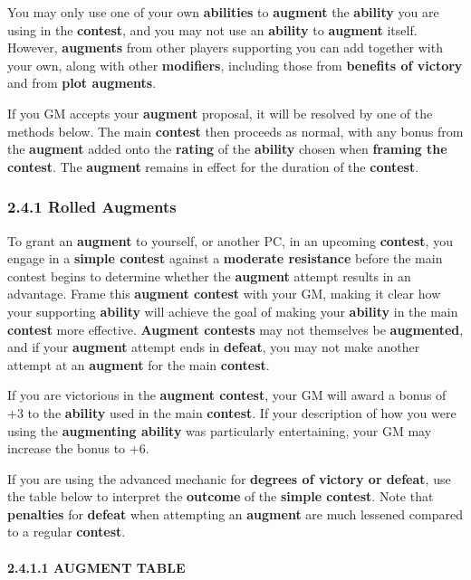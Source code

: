 \documentclass[
]{article}
\begin{document}
You may only use one of your own \textbf{abilities} to \textbf{augment}
the \textbf{ability} you are using in the \textbf{contest}, and you may
not use an \textbf{ability} to \textbf{augment} itself. However,
\textbf{augments} from other players supporting you can add together
with your own, along with other \textbf{modifiers}, including those from
\textbf{benefits of victory} and from \textbf{plot augments}.

If you GM accepts your \textbf{augment} proposal, it will be resolved by
one of the methods below. The main \textbf{contest} then proceeds as
normal, with any bonus from the \textbf{augment} added onto the
\textbf{rating} of the \textbf{ability} chosen when \textbf{framing the
contest}. The \textbf{augment} remains in effect for the duration of the
\textbf{contest}.

\hypertarget{rolled-augments}{%
\subsubsection{2.4.1 Rolled Augments}\label{rolled-augments}}

To grant an \textbf{augment} to yourself, or another PC, in an upcoming
\textbf{contest}, you engage in a \textbf{simple contest} against a
\textbf{moderate resistance} before the main contest begins to determine
whether the \textbf{augment} attempt results in an advantage. Frame this
\textbf{augment contest} with your GM, making it clear how your
supporting \textbf{ability} will achieve the goal of making your
\textbf{ability} in the main \textbf{contest} more effective.
\textbf{Augment contests} may not themselves be \textbf{augmented}, and
if your \textbf{augment} attempt ends in \textbf{defeat}, you may not
make another attempt at an \textbf{augment} for the main
\textbf{contest}.

If you are victorious in the \textbf{augment contest}, your GM will
award a bonus of +3 to the \textbf{ability} used in the main
\textbf{contest}. If your description of how you were using the
\textbf{augmenting ability} was particularly entertaining, your GM may
increase the bonus to +6.

If you are using the advanced mechanic for \textbf{degrees of victory or
defeat}, use the table below to interpret the \textbf{outcome} of the
\textbf{simple contest}. Note that \textbf{penalties} for
\textbf{defeat} when attempting an \textbf{augment} are much lessened
compared to a regular \textbf{contest}.

\hypertarget{augment-table}{%
\paragraph{2.4.1.1 AUGMENT TABLE}\label{augment-table}}
\end{document}
